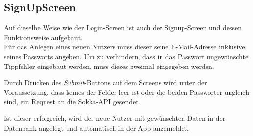 \subsection{SignUpScreen}

Auf dieselbe Weise wie der Login-Screen ist auch der Signup-Screen und dessen Funktionsweise
aufgebaut.\\
Für das Anlegen eines neuen Nutzers muss dieser seine E-Mail-Adresse inklusive seines Passworts
angeben. Um zu verhindern, dass in das Passwort ungewünschte Tippfehler eingebaut werden, muss dieses
zweimal eingegeben werden.

Durch Drücken des \textit{Submit}-Buttons auf dem Screens wird unter der Voraussetzung, dass
keines der Felder leer ist oder die beiden Passwörter ungleich sind, ein Request an die Sokka-API
gesendet.

Ist dieser erfolgreich, wird der neue Nutzer mit gewünschten Daten in der Datenbank angelegt und
automatisch in der App angemeldet.